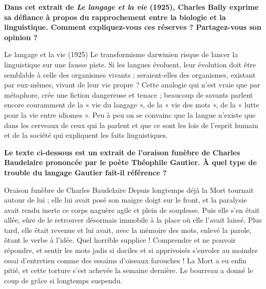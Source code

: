 \begin{keybox}[III]
\textbf{Dans cet extrait de \textit{Le langage et la vie} (1925), Charles Bally exprime sa défiance à propos du rapprochement entre la biologie et la linguistique. Comment expliquez-vous ces réserves ? Partagez-vous son opinion ?}
\begin{lecture}{Le langage et la vie (1925)}
Le transformisme darwinien risque de lancer la linguistique sur une fausse piste. Si les langues évoluent, leur évolution doit être semblable à celle des organismes vivants ; seraient-elles des organismes, existant par eux-mêmes, vivant de leur vie propre ? Cette analogie qui n’est vraie que par métaphore, crée une fiction dangereuse et tenace ; beaucoup de savants parlent encore couramment de la « vie du langage », de la « vie des mots », de la « lutte pour la vie entre idiomes ». Peu à peu on se convainc que la langue n’existe que dans les cerveaux de ceux qui la parlent et que ce sont les lois de l’esprit humain et de la société qui expliquent les faits linguistiques.
\end{lecture}
\end{keybox}

\begin{keybox}[IV]
\textbf{Le texte ci-dessous est un extrait de l’oraison funèbre de Charles Baudelaire prononcée par le poète Théophile Gautier. À quel type de trouble du langage Gautier fait-il référence ?}
\begin{lecture}{Oraison funèbre de Charles Baudelaire}
Depuis longtemps déjà la Mort tournait autour de lui ; elle lui avait posé son maigre doigt sur le front, et la paralysie avait rendu inerte ce corps naguère agile et plein de souplesse. Puis elle s’en était allée, sûre de le retrouver désormais immobile à la place où elle l’avait laissé. Plus tard, elle était revenue et lui avait, avec la mémoire des mots, enlevé la parole, ôtant le verbe à l’idée. Quel horrible supplice ! Comprendre et ne pouvoir répondre, et sentir les mots jadis si dociles et si apprivoisés s’envoler au moindre essai d’entretien comme des essaims d’oiseaux farouches ! La Mort a eu enfin pitié, et cette torture s’est achevée la semaine dernière. Le bourreau a donné le coup de grâce si longtemps suspendu.
\end{lecture}
\end{keybox}

